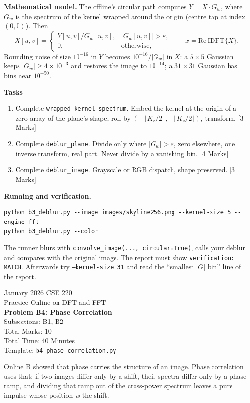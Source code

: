 \documentclass[11pt]{article}
\newcommand{\file}[1]{\texttt{#1}}
\newcommand{\code}[1]{\texttt{#1}}
\newcommand{\problemheader}[3]{%
  \begin{center}
    {\large January 2026 CSE 220}\\
    {\large Practice Online on DFT and FFT}\\[2pt]
    {\Large\bfseries #1}\\[2pt]
    Subsections: #2\\
    Total Marks: 10\\
    Total Time: 40 Minutes\\[2pt]
    {\small Template: \file{#3}}
  \end{center}
  \vspace{4pt}
}
\begin{document}
\textbf{Mathematical model.} The offline's circular path computes
$Y = X \cdot G_w$, where $G_w$ is the spectrum of the kernel wrapped around the
origin (centre tap at index $(0,0)$). Then
\[
  X[u,v] =
  \begin{cases}
    Y[u,v] / G_w[u,v], & |G_w[u,v]| > \varepsilon, \\
    0, & \text{otherwise},
  \end{cases}
  \qquad x = \mathrm{Re}\,\mathrm{IDFT}\{X\}.
\]
Rounding noise of size $10^{-16}$ in $Y$ becomes $10^{-16} / |G_w|$ in $X$: a
$5 \times 5$ Gaussian keeps $|G_w| \ge 4 \times 10^{-3}$ and restores the image
to $10^{-14}$; a $31 \times 31$ Gaussian has bins near $10^{-50}$.

\textbf{Tasks}
\begin{enumerate}[nosep]
  \item Complete \code{wrapped\_kernel\_spectrum}. Embed the kernel at the
        origin of a zero array of the plane's shape, roll by
        $(-\lfloor K_r/2 \rfloor, -\lfloor K_c/2 \rfloor)$, transform.
        \hfill [3 Marks]
  \item Complete \code{deblur\_plane}. Divide only where $|G_w| > \varepsilon$,
        zero elsewhere, one inverse transform, real part. Never divide by a
        vanishing bin.
        \hfill [4 Marks]
  \item Complete \code{deblur\_image}. Grayscale or RGB dispatch, shape
        preserved.
        \hfill [3 Marks]
\end{enumerate}

\textbf{Running and verification.}
\begin{lstlisting}
python b3_deblur.py --image images/skyline256.png --kernel-size 5 --engine fft
python b3_deblur.py --color
\end{lstlisting}
The runner blurs with \code{convolve\_image(..., circular=True)}, calls your
deblur and compares with the original image. The report must show
\code{verification: MATCH}. Afterwards try \code{--kernel-size 31} and read the
``smallest $|G|$ bin'' line of the report.

\newpage
\problemheader{Problem B4: Phase Correlation}{B1, B2}{b4\_phase\_correlation.py}

Online B showed that phase carries the structure of an image. Phase
correlation uses that: if two images differ only by a shift, their spectra
differ only by a phase ramp, and dividing that ramp out of the cross-power
spectrum leaves a pure impulse whose position \emph{is} the shift.
\end{document}
